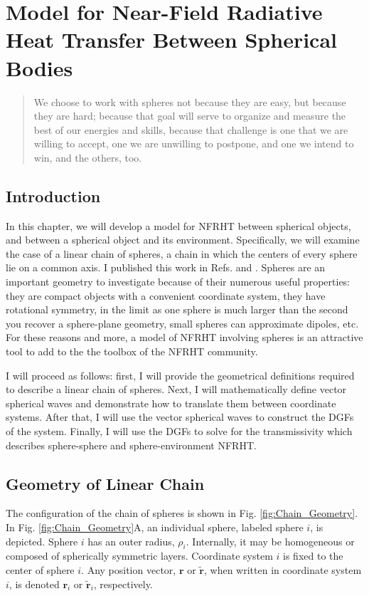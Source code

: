 \chapter[Model for Near-Field Radiative Heat Transfer Between Spherical Bodies][Model for Near-Field Radiative Heat Transfer Between Spherical Bodies]{Model for Near-Field Radiative Heat Transfer Between Spherical Bodies} \label{ch:model} \allowdisplaybreaks

\begin{quote}
    We choose to work with spheres not because they are easy, but because they are hard; because that goal will serve to organize and measure the best of our energies and skills, because that challenge is one that we are willing to accept, one we are unwilling to postpone, and one we intend to win, and the others, too. 
\end{quote}

\section{Introduction}
%
In this chapter, we will develop a model for NFRHT between spherical objects, and between a spherical object and its environment. Specifically, we will examine the case of a linear chain of spheres, a chain in which the centers of every sphere lie on a common axis. I published this work in Refs.  and . Spheres are an important geometry to investigate because of their numerous useful properties: they are compact objects with a convenient coordinate system, they have rotational symmetry, in the limit as one sphere is much larger than the second you recover a sphere-plane geometry, small spheres can approximate dipoles, etc. For these reasons and more, a model of NFRHT involving spheres is an attractive tool to add to the the toolbox of the NFRHT community.

I will proceed as follows: first, I will provide the geometrical definitions required to describe a linear chain of spheres. Next, I will mathematically define vector spherical waves and demonstrate how to translate them between coordinate systems. After that, I will use the vector spherical waves to construct the DGFs of the system. Finally, I will use the DGFs to solve for the transmissivity which describes sphere-sphere and sphere-environment NFRHT.

\section{Geometry of Linear Chain}
%
The configuration of the chain of spheres is shown in Fig. \ref{fig:Chain_Geometry}. In Fig. \ref{fig:Chain_Geometry}A, an individual sphere, labeled sphere $i$, is depicted. Sphere $i$ has an outer radius, $\rho_{i}$. Internally, it may be homogeneous or composed of spherically symmetric layers. Coordinate system $i$ is fixed to the center of sphere $i$. Any position vector, $\boldsymbol{r}$ or $\widetilde{\boldsymbol{r}}$, when written in coordinate system $i$, is denoted $\boldsymbol{r}_{i}$ or $\widetilde{\boldsymbol{r}}_{i}$, respectively. 

